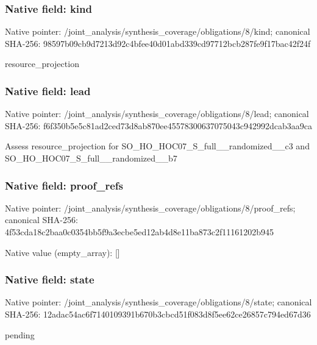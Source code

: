 \documentclass[10pt,a4paper]{article}
\begin{document}
\subsubsection{Native field: kind}
Native pointer: /joint\_\allowbreak{}analysis/synthesis\_\allowbreak{}coverage/obligations/8/kind; canonical SHA-256: 98597b09cb9d7213d92c4bfee40d01abd339cd97712bcb287fe9f17bac42f24f

\begingroup\raggedright\sloppy resource\_\allowbreak{}projection\par\endgroup

\subsubsection{Native field: lead}
Native pointer: /joint\_\allowbreak{}analysis/synthesis\_\allowbreak{}coverage/obligations/8/lead; canonical SHA-256: f6f350b5e5c81ad2ced73d8ab870ee45578300637075043c942992dcab3aa9ca

\begingroup\raggedright\sloppy Assess resource\_\allowbreak{}projection for SO\_\allowbreak{}HO\_\allowbreak{}HOC07\_\allowbreak{}S\_\allowbreak{}full\_\allowbreak{}\_\allowbreak{}randomized\_\allowbreak{}\_\allowbreak{}c3 and SO\_\allowbreak{}HO\_\allowbreak{}HOC07\_\allowbreak{}S\_\allowbreak{}full\_\allowbreak{}\_\allowbreak{}randomized\_\allowbreak{}\_\allowbreak{}b7\par\endgroup

\subsubsection{Native field: proof\_\allowbreak{}refs}
Native pointer: /joint\_\allowbreak{}analysis/synthesis\_\allowbreak{}coverage/obligations/8/proof\_\allowbreak{}refs; canonical SHA-256: 4f53cda18c2baa0c0354bb5f9a3ecbe5ed12ab4d8e11ba873c2f11161202b945

Native value (empty\_\allowbreak{}array): []

\subsubsection{Native field: state}
Native pointer: /joint\_\allowbreak{}analysis/synthesis\_\allowbreak{}coverage/obligations/8/state; canonical SHA-256: 12adac54ac6f7140109391b670b3cbcd51f083d8f5ee62ce26857c794ed67d36

\begingroup\raggedright\sloppy pending\par\endgroup
\end{document}
